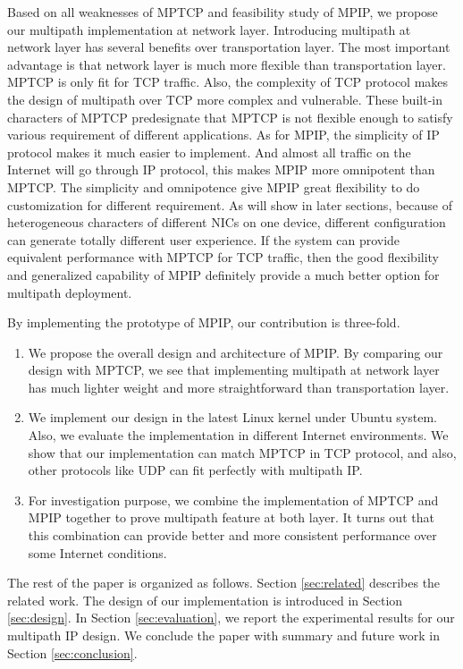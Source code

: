 Based on all weaknesses of MPTCP and feasibility study of MPIP, we propose our multipath implementation at network layer. Introducing multipath at network layer has several benefits over transportation layer. The most important advantage is that network layer is much more flexible than transportation layer. MPTCP is only fit for TCP traffic. Also, the complexity of TCP protocol makes the design of multipath over TCP more complex and vulnerable. These built-in characters of MPTCP predesignate that MPTCP is not flexible enough to satisfy various requirement of different applications. As for MPIP, the simplicity of IP protocol makes it much easier to implement. And almost all traffic on the Internet will go through IP protocol, this makes MPIP more omnipotent than MPTCP.  The simplicity and omnipotence give MPIP great flexibility to do customization for different requirement. As will show in later sections, because of heterogeneous characters of different NICs on one device, different configuration can generate totally different user experience. If the system can provide equivalent performance with MPTCP for TCP traffic, then the good flexibility and generalized capability of MPIP definitely provide a much better option for multipath deployment.

By implementing the prototype of MPIP, our contribution is three-fold.
\begin{enumerate}
\item We propose the overall design and architecture of MPIP. By comparing our design with MPTCP, we see that implementing multipath at network layer has much lighter weight and more straightforward than transportation layer.

\item We implement our design in the latest Linux kernel under Ubuntu system. Also, we evaluate the implementation in different Internet environments. We show that our implementation can match MPTCP in TCP protocol, and also, other protocols like UDP can fit perfectly with multipath IP.

\item For investigation purpose, we combine the implementation of MPTCP and MPIP together to prove multipath feature at both layer. It turns out that this combination can provide better and more consistent performance over some Internet conditions.
\end{enumerate}

The rest of the paper is organized as follows. Section \ref{sec:related} describes the related work.
The design of our implementation is introduced in Section \ref{sec:design}. In Section \ref{sec:evaluation}, we report the experimental results for our multipath IP design. We conclude the paper with summary and future work in Section \ref{sec:conclusion}.
